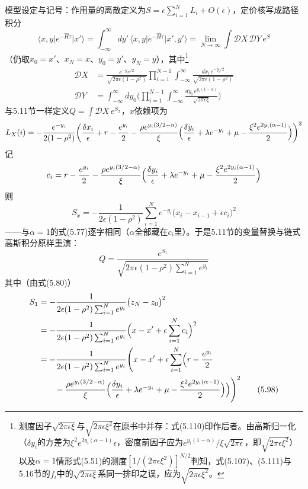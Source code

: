 模型设定与记号：作用量的离散定义为$S=\epsilon\sum_{i=1}^{N}L_i+O(\epsilon)$，定价核写成路径积分
\begin{equation*}
\langle x,y\vert e^{-\hat{H}\tau}\vert x'\rangle
=\int_{-\infty}^{\infty}dy'\,\langle x,y\vert e^{-\hat{H}\tau}\vert x',y'\rangle
=\lim_{N\to\infty}\int\mathcal{D}X\,\mathcal{D}Y\,e^{S}
\end{equation*}
（仍取$x_0=x'$、$x_N=x$、$y_0=y'$、$y_N=y$），其中\footnote{测度因子$\sqrt{2\pi\epsilon\xi}$与$\sqrt{2\pi\epsilon\xi^{2}}$在原书中并存：式(5.110)印作后者。由高斯归一化（$\delta y_i$的方差为$\xi^{2}e^{2y_i(\alpha-1)}\epsilon$，密度前因子应为$e^{y_i(1-\alpha)}/\xi\sqrt{2\pi\epsilon}$，即$\sqrt{2\pi\epsilon\xi^{2}}$）以及$\alpha=1$情形式(5.51)的测度$[1/(2\pi\epsilon\xi^{2})]^{N/2}$判知，式(5.107)、(5.111)与5.16节的$f_i$中的$\sqrt{2\pi\epsilon\xi}$系同一排印之误，应为$\sqrt{2\pi\epsilon\xi^{2}}$。}
\begin{align*}
\mathcal{D}X&=\frac{e^{-y_N/2}}{\sqrt{2\pi\epsilon(1-\rho^{2})}}
\prod_{i=1}^{N-1}\int_{-\infty}^{\infty}\frac{dx_i\,e^{-y_i/2}}{\sqrt{2\pi\epsilon(1-\rho^{2})}}\\
\mathcal{D}Y&=\int_{-\infty}^{\infty}dy_0\biggl(\prod_{i=1}^{N-1}\int_{-\infty}^{\infty}
\frac{dy_i\,e^{y_i(1-\alpha)}}{\sqrt{2\pi\epsilon\xi}}\biggr)
\end{align*}与5.11节一样定义$Q=\int\mathcal{D}X\,e^{S_x}$，$x$依赖项为
\begin{equation*}
L_{X}(i)=-\frac{e^{-y_i}}{2(1-\rho^{2})}\biggl(\frac{\delta x_i}{\epsilon}
+r-\frac{e^{y_i}}{2}-\frac{\rho e^{y_i(3/2-\alpha)}}{\xi}
\Bigl(\frac{\delta y_i}{\epsilon}+\lambda e^{-y_i}+\mu-\frac{\xi^{2}e^{2y_i(\alpha-1)}}{2}\Bigr)\biggr)^{2}
\end{equation*}
记
\begin{equation*}
c_i=r-\frac{e^{y_i}}{2}-\frac{\rho e^{y_i(3/2-\alpha)}}{\xi}
\Bigl(\frac{\delta y_i}{\epsilon}+\lambda e^{-y_i}+\mu-\frac{\xi^{2}e^{2y_i(\alpha-1)}}{2}\Bigr)
\end{equation*}
则
\begin{equation*}
S_{x}=-\frac{1}{2\epsilon(1-\rho^{2})}\sum_{i=1}^{N}e^{-y_i}
\bigl(x_i-x_{i-1}+\epsilon c_i\bigr)^{2}
\end{equation*}
——与$\alpha=1$的式(5.77)逐字相同（$\alpha$全部藏在$c_i$里）。于是5.11节的变量替换与链式高斯积分原样重演：
\begin{equation*}
Q=\frac{e^{S_1}}{\sqrt{2\pi\epsilon(1-\rho^{2})\sum_{i=1}^{N}e^{y_i}}}
\end{equation*}
其中（由式(5.80)）
\begin{align*}
S_{1}&=-\frac{1}{2\epsilon(1-\rho^{2})\sum_{i=1}^{N}e^{y_i}}\bigl(z_N-z_0\bigr)^{2}\\
&=-\frac{1}{2\epsilon(1-\rho^{2})\sum_{i=1}^{N}e^{y_i}}
\Bigl(x-x'+\epsilon\sum_{i=1}^{N}c_i\Bigr)^{2}\\
&=-\frac{1}{2\epsilon(1-\rho^{2})\sum_{i=1}^{N}e^{y_i}}\Biggl(x-x'
+\epsilon\sum_{i=1}^{N}\Bigl(r-\frac{e^{y_i}}{2}\\
&\qquad-\frac{\rho e^{y_i(3/2-\alpha)}}{\xi}\Bigl(\frac{\delta y_i}{\epsilon}
+\lambda e^{-y_i}+\mu-\frac{\xi^{2}e^{2y_i(\alpha-1)}}{2}\Bigr)\Bigr)\Biggr)^{2}
\tag{5.98}
\end{align*}
